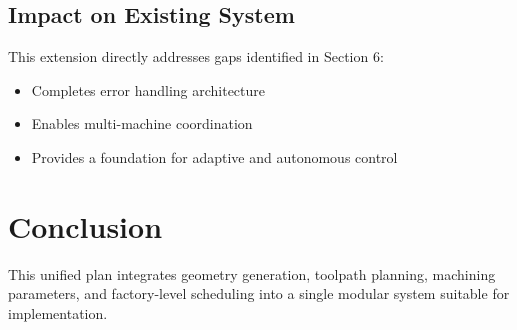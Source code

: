 \documentclass{article}
\begin{document}
\subsection{Impact on Existing System}

This extension directly addresses gaps identified in Section 6:
\begin{itemize}
    \item Completes error handling architecture
    \item Enables multi-machine coordination
    \item Provides a foundation for adaptive and autonomous control
\end{itemize}

\section{Conclusion}
This unified plan integrates geometry generation, toolpath planning, machining parameters, and factory-level scheduling into a single modular system suitable for implementation.
\end{document}
